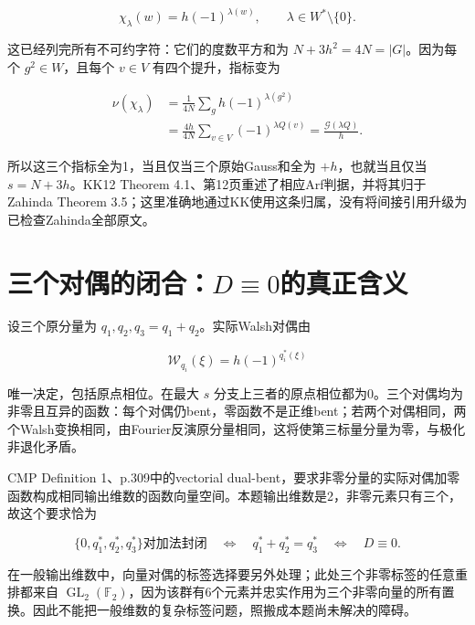 \documentclass[UTF8,fontset=fandol,zihao=-4,openany,oneside]{ctexbook}
\begin{document}
\[
\chi_\lambda(w)=h(-1)^{\lambda(w)},\qquad
\lambda\in W^*\setminus\{0\}.
\]



这已经列完所有不可约字符：它们的度数平方和为 \(N+3h^2=4N=|G|\)。因为每个 \(g^2\in W\)，且每个 \(v\in V\) 有四个提升，指标变为



\[
\begin{aligned}
\nu(\chi_\lambda)
&=\frac1{4N}\sum_g h(-1)^{\lambda(g^2)}\\
&=\frac{4h}{4N}\sum_{v\in V}(-1)^{\lambda Q(v)}
=\frac{\mathcal G(\lambda Q)}h.
\end{aligned}
\]



所以这三个指标全为1，当且仅当三个原始Gauss和全为 \(+h\)，也就当且仅当 \(s=N+3h\)。KK12 Theorem 4.1、第12页重述了相应Arf判据，并将其归于Zahinda Theorem 3.5；这里准确地通过KK使用这条归属，没有将间接引用升级为已检查Zahinda全部原文。



\section{三个对偶的闭合：\texorpdfstring{\(D\equiv0\)}{Dequiv0}的真正含义}


设三个原分量为 \(q_1,q_2,q_3=q_1+q_2\)。实际Walsh对偶由



\[
\mathcal W_{q_i}(\xi)=h(-1)^{q_i^*(\xi)}
\]



唯一决定，包括原点相位。在最大 \(s\) 分支上三者的原点相位都为0。三个对偶均为非零且互异的函数：每个对偶仍bent，零函数不是正维bent；若两个对偶相同，两个Walsh变换相同，由Fourier反演原分量相同，这将使第三标量分量为零，与极化非退化矛盾。



CMP Definition 1、p.309中的vectorial dual-bent，要求非零分量的实际对偶加零函数构成相同输出维数的函数向量空间。本题输出维数是2，非零元素只有三个，故这个要求恰为



\[
\{0,q_1^*,q_2^*,q_3^*\}\text{对加法封闭}
\quad\Longleftrightarrow\quad q_1^*+q_2^*=q_3^*
\quad\Longleftrightarrow\quad D\equiv0.
\]



在一般输出维数中，向量对偶的标签选择要另外处理；此处三个非零标签的任意重排都来自 \(\operatorname{GL}_2(\mathbb F_2)\)，因为该群有6个元素并忠实作用为三个非零向量的所有置换。因此不能把一般维数的复杂标签问题，照搬成本题尚未解决的障碍。
\end{document}
